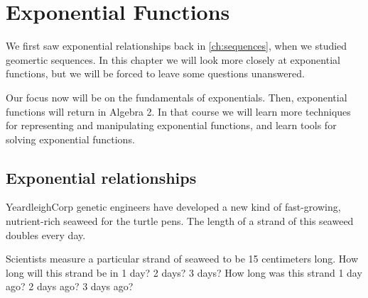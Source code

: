 \chapter{Exponential Functions}
\label{ch:expofunc}


We first saw exponential relationships back in \cref{ch:sequences}, when we studied geomertic sequences. In this chapter we will look more closely at exponential functions, but we will be forced to leave some questions unanswered.

Our focus now will be on the fundamentals of exponentials. Then, exponential functions will return in Algebra 2. In that course we will learn more techniques for representing and manipulating exponential functions, and learn tools for solving exponential functions.

%

\section{Exponential relationships}
\label{sec:exporelationships}

\begin{boxedexplore}
YeardleighCorp genetic engineers have developed a new kind of fast-growing, nutrient-rich seaweed for the turtle pens. The length of a strand of this seaweed doubles every day.

Scientists measure a particular strand of seaweed to be 15 centimeters long. How long will this strand be in 1 day? 2 days? 3 days? How long was this strand 1 day ago? 2 days ago? 3 days ago?
\end{boxedexplore}

